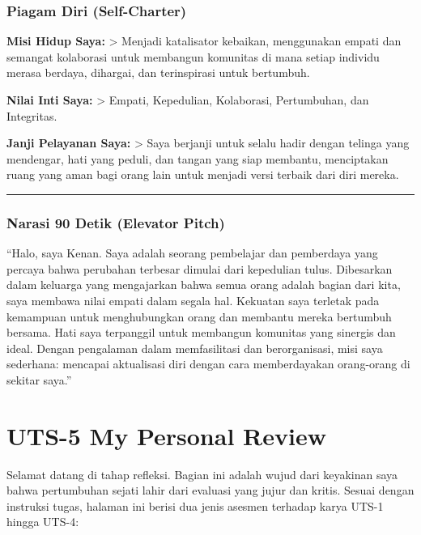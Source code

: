 \documentclass[
  letterpaper,
  DIV=11,
  numbers=noendperiod]{scrreprt}
\begin{document}
\subsection{Piagam Diri (Self-Charter)}\label{piagam-diri-self-charter}

\textbf{Misi Hidup Saya:} \textgreater{} Menjadi katalisator kebaikan,
menggunakan empati dan semangat kolaborasi untuk membangun komunitas di
mana setiap individu merasa berdaya, dihargai, dan terinspirasi untuk
bertumbuh.

\textbf{Nilai Inti Saya:} \textgreater{} Empati, Kepedulian, Kolaborasi,
Pertumbuhan, dan Integritas.

\textbf{Janji Pelayanan Saya:} \textgreater{} Saya berjanji untuk selalu
hadir dengan telinga yang mendengar, hati yang peduli, dan tangan yang
siap membantu, menciptakan ruang yang aman bagi orang lain untuk menjadi
versi terbaik dari diri mereka.

\begin{center}\rule{0.5\linewidth}{0.5pt}\end{center}

\subsection{Narasi 90 Detik (Elevator
Pitch)}\label{narasi-90-detik-elevator-pitch}

``Halo, saya Kenan. Saya adalah seorang pembelajar dan pemberdaya yang
percaya bahwa perubahan terbesar dimulai dari kepedulian tulus.
Dibesarkan dalam keluarga yang mengajarkan bahwa semua orang adalah
bagian dari kita, saya membawa nilai empati dalam segala hal. Kekuatan
saya terletak pada kemampuan untuk menghubungkan orang dan membantu
mereka bertumbuh bersama. Hati saya terpanggil untuk membangun komunitas
yang sinergis dan ideal. Dengan pengalaman dalam memfasilitasi dan
berorganisasi, misi saya sederhana: mencapai aktualisasi diri dengan
cara memberdayakan orang-orang di sekitar saya.''


\chapter{UTS-5 My Personal Review}\label{uts-5-my-personal-review}

Selamat datang di tahap refleksi. Bagian ini adalah wujud dari keyakinan
saya bahwa pertumbuhan sejati lahir dari evaluasi yang jujur dan kritis.
Sesuai dengan instruksi tugas, halaman ini berisi dua jenis asesmen
terhadap karya UTS-1 hingga UTS-4:
\end{document}
